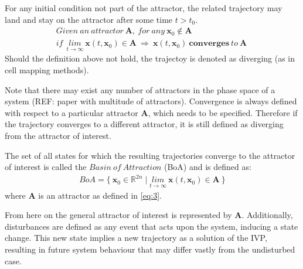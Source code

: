     For any initial condition not part of the attractor, the related trajectory may land and stay on the attractor after some time $t > t_0$. 
    \begin{gather} \label{eq:6} Given\ an\ attractor\ \mathbf{A},\ for\ any\ \mathbf{x}_0 \notin \mathbf{A}\\ if\ \ \underset{t \rightarrow \infty}{lim} \ \mathbf{x}(t,\mathbf{x}_0) \in \mathbf{A}\ \Rightarrow\
    \mathbf{x}(t,\mathbf{x}_0)\ \mathbf{converges}\ to\ \mathbf{A}\ \end{gather}
    Should the definition above not hold, the trajectoy is denoted as diverging (as in cell mapping methods). 

    Note that there may exist any number of attractors in the phase space of a system (REF: paper with multitude of attractors). Convergence is always defined with respect to a particular attractor $\mathbf{A}$, which needs to be specified. Therefore if the trajectory converges to a different attractor, it is still defined as diverging from the attractor of interest.  

    The set of all states for which the resulting trajectories converge to the attractor of interest is called the $Basin\ of\ Attraction$ (BoA) and is defined as: 
    \begin{gather} \label{eq:7} BoA = \{\ \mathbf{x}_0 \in \mathbb{R}^{2n} \mid  \underset{t \rightarrow \infty}{lim} \ \mathbf{x}(t,\mathbf{x}_0) \in \mathbf{A}\ \}\end{gather}
    where $\mathbf{A}$ is an attractor as defined in \ref{eq:3}.

    From here on the general attractor of interest is represented by $\mathbf{A}$.
    Additionally, disturbances are defined as any event that acts upon the system, inducing a state change. This new state implies a new trajectory as a solution of the IVP, resulting in future system behaviour that may differ vastly from the undisturbed case.





